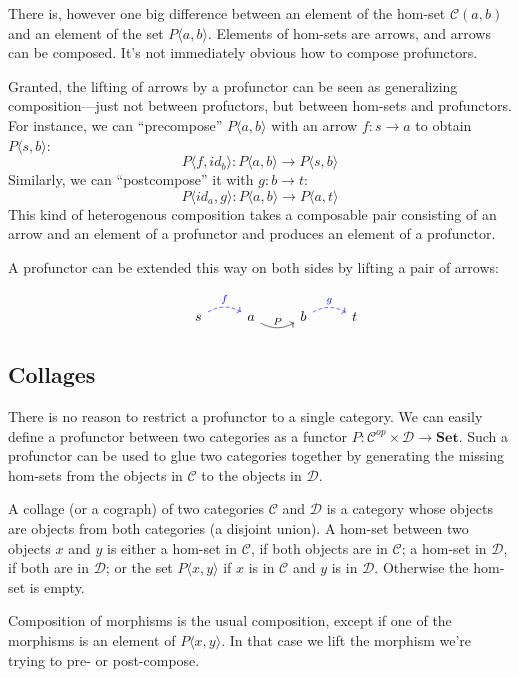 \documentclass[DaoFP]{subfiles}
\begin{document}
There is, however one big difference between an element of the hom-set $ \mathcal{C}(a, b)$ and an element of the set $P\langle a, b \rangle$. Elements of hom-sets are arrows, and arrows can be composed. It's not immediately obvious how to compose profunctors. 

Granted, the lifting of arrows by a profunctor can be seen as generalizing composition---just not between profuctors, but between hom-sets and profunctors. For instance, we can ``precompose'' $P \langle a, b \rangle$ with an arrow $f \colon s \to a$ to obtain $P \langle s, b \rangle$:
\[ P\langle f, id_b \rangle \colon P \langle a, b \rangle \to P \langle s, b \rangle \]
Similarly, we can ``postcompose'' it with $g \colon b \to t$:
\[ P \langle id_a, g \rangle \colon P \langle a, b \rangle \to P \langle a, t \rangle \]
This kind of heterogenous composition takes a composable pair consisting of an arrow and an element of a profunctor and produces an element of a profunctor.

A profunctor can be extended this way on both sides by lifting a pair of arrows:

\[
 \begin{tikzcd}
  & s
  \arrow[r, bend left, dashed, blue, "f"]
 & a
 \arrow[r, bend right, "P"]
 & b
  \arrow[r, bend left, dashed, blue, "g"]
 &  t
  \end{tikzcd}
\]

\subsection{Collages}

There is no reason to restrict a profunctor to a single category. We can easily define a profunctor between two categories as a functor $ P \colon \mathcal{C}^{op} \times  \mathcal{D} \to \mathbf{Set}$. Such a profunctor can be used to glue two categories together by generating the missing hom-sets from the objects in $\mathcal{C}$ to the objects in $\mathcal{D}$. 

A collage (or a cograph) of two categories $\mathcal{C}$ and $\mathcal{D}$ is a category whose objects are objects from both categories (a disjoint union). A hom-set between two objects $x$ and $y$ is either a hom-set in $\mathcal{C}$, if both objects are in $\mathcal{C}$; a hom-set in $\mathcal{D}$, if both are in $\mathcal{D}$; or the set $P \langle x, y\rangle$ if $x$ is in $\mathcal{C}$ and $y$ is in $\mathcal{D}$. Otherwise the hom-set is empty. 

Composition of morphisms is the usual composition, except if one of the morphisms is an element of $P \langle x, y \rangle$. In that case we lift the morphism we're trying to pre- or post-compose. 
\end{document}
